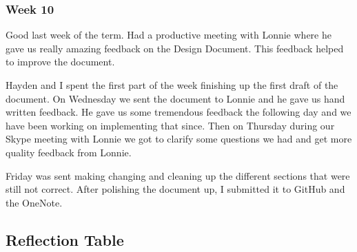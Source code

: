 \documentclass[draftclsnofoot, onecolumn, compsoc, 10pt]{IEEEtran}
\begin{document}
\subsubsection{Week 10}
Good last week of the term. Had a productive meeting with Lonnie where he gave us really amazing feedback on the Design Document. This feedback helped to improve the document. 

Hayden and I spent the first part of the week finishing up the first draft of the document. On Wednesday we sent the document to Lonnie and he gave us hand written feedback. He gave us some tremendous feedback the following day and we have been working on implementing that since. Then on Thursday during our Skype meeting with Lonnie we got to clarify some questions we had and get more quality feedback from Lonnie.

Friday was sent making changing and cleaning up the different sections that were still not correct. After polishing the document up, I submitted it to GitHub and the OneNote.

\subsection{Reflection Table}
\bgroup
  \def\arraystretch{1.5}
\egroup
\end{document}
